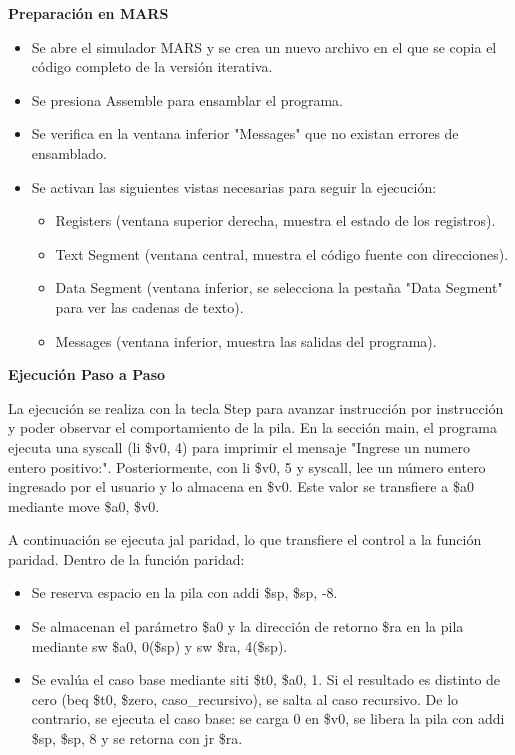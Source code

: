 \documentclass[12pt, letterpaper]{article}
\begin{document}
\textbf{Preparación en MARS}
\begin{itemize}
    \item Se abre el simulador MARS y se crea un nuevo archivo en el que se copia el código completo de la versión iterativa.
    \item Se presiona Assemble para ensamblar el programa.
    \item Se verifica en la ventana inferior "Messages" que no existan errores de ensamblado.
    \item Se activan las siguientes vistas necesarias para seguir la ejecución:
    \begin{itemize}
            \item Registers (ventana superior derecha, muestra el estado de los registros).
            \item Text Segment (ventana central, muestra el código fuente con direcciones).
            \item Data Segment (ventana inferior, se selecciona la pestaña "Data Segment" para ver las cadenas de texto).
            \item Messages (ventana inferior, muestra las salidas del programa).
        \end{itemize}
\end{itemize} 

\textbf{Ejecución Paso a Paso}

La ejecución se realiza con la tecla Step para avanzar instrucción por instrucción y poder observar el comportamiento de la pila. En la sección main, el programa ejecuta una syscall (li \$v0, 4) para imprimir el mensaje "Ingrese un numero entero positivo:". Posteriormente, con li \$v0, 5 y syscall, lee un número entero ingresado por el usuario y lo almacena en \$v0. Este valor se transfiere a \$a0 mediante move \$a0, \$v0.

A continuación se ejecuta jal paridad, lo que transfiere el control a la función paridad. Dentro de la función paridad:
\begin{itemize}
    \item Se reserva espacio en la pila con addi \$sp, \$sp, -8.
    \item Se almacenan el parámetro \$a0 y la dirección de retorno \$ra en la pila mediante sw \$a0, 0(\$sp) y sw \$ra, 4(\$sp).
    \item Se evalúa el caso base mediante siti \$t0, \$a0, 1. Si el resultado es distinto de cero (beq \$t0, \$zero, caso\_recursivo), se salta al caso recursivo. De lo contrario, se ejecuta el caso base: se carga 0 en \$v0, se libera la pila con addi \$sp, \$sp, 8 y se retorna con jr \$ra.
\end{itemize}
\end{document}
